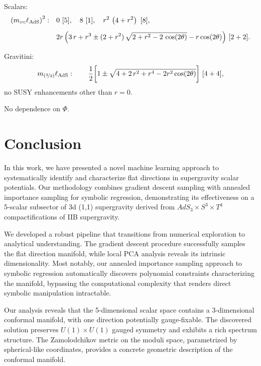 \documentclass[11pt]{article}
\def\sst#1{{\scriptscriptstyle #1}}
\def\sst#1{{\scriptscriptstyle #1}}
\begin{document}
Scalars:
\begin{equation}
	\begin{aligned}	
		\left(m_{\sst{(0)}}\ell_{\rm AdS}\right)^2:\quad&
		0\ [5],	\quad
		8\ [1],	\quad
		r^{2}\,\left(4+r^2\right)\ [8],	\\[5pt]
		&	2r\,\Big(3\,r+r^{3}\pm(2+r^{2})\,\sqrt{2+r^2-2\,\cos(2\theta)}-r\cos(2\theta)\Big)\ [2+2].
	\end{aligned}
\end{equation}

Gravitini:
\begin{equation}
	m_{{(\nicefrac32)}}\ell_{\rm AdS}:\quad 
	\quad \dfrac1{2}\bigg[1\pm\sqrt{4+2\,r^{2}+r^{4}-2r^{2}\cos(2\theta)}\bigg]\ [4+4],
\end{equation}
no SUSY enhancements other than $r=0$.

No dependence on $\Phi$.


\section{Conclusion}

In this work, we have presented a novel machine learning approach to systematically identify and characterize flat directions in supergravity scalar potentials. Our methodology combines gradient descent sampling with annealed importance sampling for symbolic regression, demonstrating its effectiveness on a 5-scalar subsector of 3d (1,1) supergravity derived from 
$AdS_3 \times S^3 \times T^4$ compactifications of IIB supergravity.

We developed a robust pipeline that transitions from numerical exploration to analytical understanding. The gradient descent procedure successfully samples the flat direction manifold, while local PCA analysis reveals its intrinsic dimensionality. Most notably, our annealed importance sampling approach to symbolic regression automatically discovers polynomial constraints characterizing the manifold, bypassing the computational complexity that renders direct symbolic manipulation intractable.

Our analysis reveals that the 5-dimensional scalar space contains a 3-dimensional conformal manifold, with one direction potentially gauge-fixable. The discovered solution preserves $U(1) \times U(1)$ gauged symmetry and exhibits a rich spectrum structure. The Zamolodchikov metric on the moduli space, parametrized by spherical-like coordinates, provides a concrete geometric description of the conformal manifold.
\end{document}
